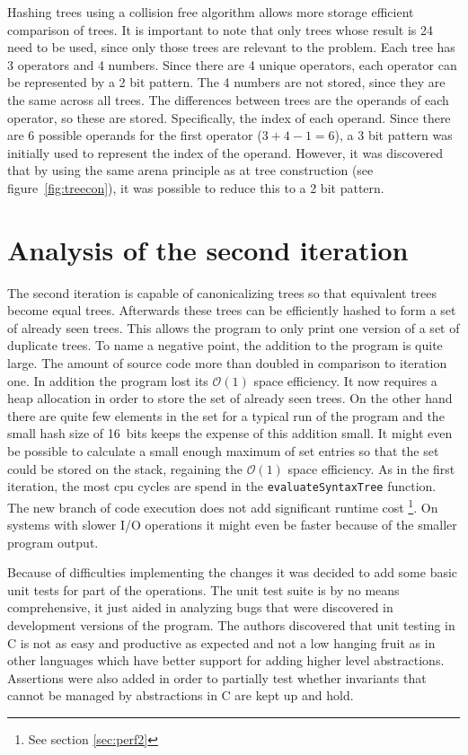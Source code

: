 \documentclass[11pt,a4paper]{article}
\newcommand{\code}[1]{\texttt{#1}}
\begin{document}
Hashing trees using a collision free algorithm allows more storage
efficient comparison of trees. It is important to note that only trees 
whose result is 24 need to be used, since only those trees are relevant 
to the problem.
Each tree has 3 operators and 4 numbers. Since there are 4 unique operators,
each operator can be represented by a 2 bit pattern. The 4 numbers are 
not stored, since they are the same across all trees. The differences between 
trees are the operands of each operator, so these are stored. Specifically, 
the index of each operand. Since there are 6 possible operands for the first 
operator ($3 + 4 - 1 = 6$), a 3 bit pattern was initially used to represent 
the index of the operand. However, it was discovered that by using the same 
arena principle as at tree construction (see figure~\ref{fig:treecon}), it was 
possible to reduce this to a 2 bit pattern. 

\section{Analysis of the second iteration}

The second iteration is capable of canonicalizing trees so that
equivalent trees become equal trees.
Afterwards these trees can be efficiently hashed to form a set of
already seen trees.
This allows the program to only print one version of a set of
duplicate trees.
To name a negative point, the addition to the program is quite large.
The amount of source code more than doubled in comparison to iteration
one.
In addition the program lost its $\mathcal{O}(1)$ space efficiency.
It now requires a heap allocation in order to store the set of already
seen trees.
On the other hand there are quite few elements in the set for a
typical run of the program and the small hash size of 16~bits keeps
the expense of this addition small.
It might even be possible to calculate a small enough maximum of set
entries so that the set could be stored on the stack, regaining the
$\mathcal{O}(1)$ space efficiency.
As in the first iteration, the most cpu cycles are spend in the
\code{evaluateSyntaxTree} function.
The new branch of code execution does not add significant runtime
cost \footnote{See section \ref{sec:perf2}}.
On systems with slower I/O operations it might even be faster because
of the smaller program output.

Because of difficulties implementing the changes it was decided to add
some basic unit tests for part of the operations. The unit test suite
is by no means comprehensive, it just aided in analyzing bugs that
were discovered in development versions of the program.
The authors discovered that unit testing in C is not as easy and
productive as expected and not a low hanging fruit as in other
languages which have better support for adding higher level
abstractions.
Assertions were also added in order to partially test whether
invariants that cannot be managed by abstractions in C are kept up and
hold.
\end{document}
